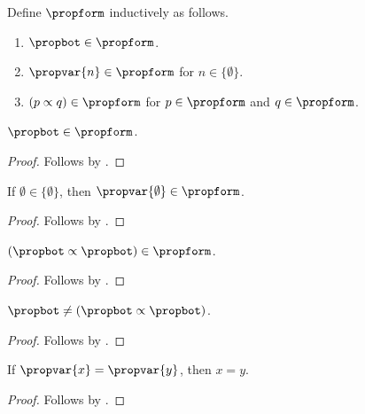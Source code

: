 \begin{datatype}\label{propform}
    Define $\propform$ inductively as follows.
    \begin{enumerate}
        \item $\propbot \in \propform$.
        \item $\propvar{n} \in \propform$ for
            $n \in \{\emptyset\}$.
        \item $(p \propto q) \in \propform$ for $p \in \propform$ and $q \in \propform$.
    \end{enumerate}
\end{datatype}
\begin{proposition}\label{propform_bot_test}
    $\propbot \in \propform$.
\end{proposition}
\begin{proof}
    Follows by .
\end{proof}

\begin{proposition}\label{propform_var_test}
    If $\emptyset \in \{\emptyset\}$, then
        $\propvar{\emptyset} \in \propform$.
\end{proposition}
\begin{proof}
    Follows by .
\end{proof}

\begin{proposition}\label{propform_imp_test}
    $(\propbot \propto \propbot) \in \propform$.
\end{proposition}
\begin{proof}
    Follows by .
\end{proof}

\begin{proposition}\label{propform_distinct_test}
    $\propbot \neq (\propbot \propto \propbot)$.
\end{proposition}
\begin{proof}
    Follows by .
\end{proof}

\begin{proposition}\label{propform_injective_test}
    If $\propvar{x} = \propvar{y}$, then $x = y$.
\end{proposition}
\begin{proof}
    Follows by .
\end{proof}
